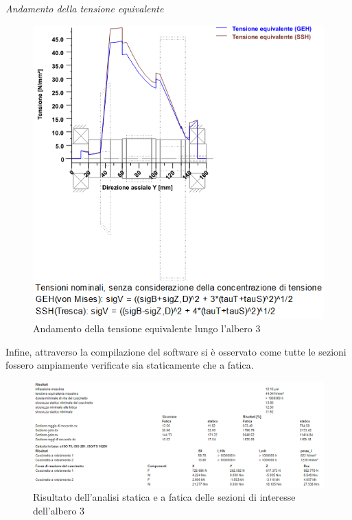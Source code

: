 \emph{Andamento della tensione equivalente}
\begin{figure}[h]
    \centering
    \includegraphics[scale=0.5]{Immagini/Tensioni3Albero3.png}
    \caption{Andamento della tensione equivalente lungo l'albero 3}
   \label{fig:Tensioni3Albero3}
\end{figure}
\newpage
Infine, attraverso la compilazione del software si è osservato come tutte le sezioni fossero ampiamente verificate sia staticamente che a fatica.
\begin{figure}[h]
    \centering
    \includegraphics[scale=0.4]{Immagini/Risultati3Albero3.png}
    \caption{Risultato dell'analisi statica e a fatica delle sezioni di interesse dell'albero 3}
    \label{fig:Risultati3Albero3}
\end{figure}

